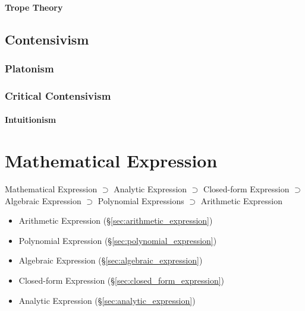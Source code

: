 \paragraph{Trope Theory}\label{sec:trope_theory}\hfill



\subsection{Contensivism}\label{sec:contensivism}

\subsubsection{Platonism}\label{sec:platonism}

\subsubsection{Critical Contensivism}\label{sec:critical_contensivism}

\paragraph{Intuitionism}\label{sec:intuitionism}\hfill



\section{Mathematical Expression}\label{sec:mathematical_expression}

Mathematical Expression $\supset$
Analytic Expression     $\supset$
Closed-form Expression  $\supset$
Algebraic Expression    $\supset$
Polynomial Expressions  $\supset$
Arithmetic Expression

\begin{itemize}
  \item Arithmetic Expression (\S\ref{sec:arithmetic_expression})
  \item Polynomial Expression (\S\ref{sec:polynomial_expression})
  \item Algebraic Expression (\S\ref{sec:algebraic_expression})
  \item Closed-form Expression (\S\ref{sec:closed_form_expression})
  \item Analytic Expression (\S\ref{sec:analytic_expression})
\end{itemize}

